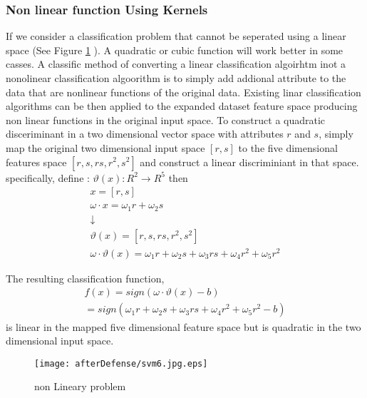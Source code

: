 \subsubsection {Non linear function Using Kernels}
If we consider a classification problem that cannot be seperated using a linear space (See Figure \ref{fig:svm6} ). A quadratic or  cubic function will work better in some casses. A classific method of converting a linear classification algoirhtm inot a nonolinear classification algoorithm is to simply add addional attribute to the data that are nonlinear functions of the original data. Existing linar classification algorithms can be then applied to the expanded dataset feature space producing non linear functions in the original input space. To construct a quadratic disceriminant in a two dimensional vector space with attributes $r$ and $s$, simply map the original two dimensional input space $\left[r,s\right]$ to the five dimensional features space $\left[r,s,rs,r^2,s^2\right]$ and construct a linear discriminiant in that space. specifically, define : $\vartheta(x):R^2  \rightarrow R^5$ then 
\begin{equation}
\begin{array}{l}
	x=[r,s] \\
	\omega \cdot x=\omega_1 r+ \omega_2 s \\
	\downarrow \\
	\vartheta(x)=\left[r,s,rs,r^2,s^2\right] \\
	
	 \omega \cdot \vartheta(x)= \omega_1 r+ \omega_2 s + \omega_3 rs+ \omega_4 r^2+\omega_5 r^2 
\end{array}
\label{eq:kernel}
\end{equation}  

The resulting classification function, 
\begin{equation}
\begin{array}{l}
f(x)=sign\left( \omega \cdot\vartheta(x)-b \right) \\
= sign\left( \omega_1 r+ \omega_2 s + \omega_3 rs+ \omega_4 r^2+\omega_5 r^2 -b \right) 
\end{array}
\label{eq:kern2}
\end{equation}  
is linear in the mapped five dimensional feature space but is quadratic in the two dimensional input space. 

\begin{figure}
	\centering
		\texttt{[image: afterDefense/svm6.jpg.eps]}
	\caption{non Lineary problem }
	\label{fig:svm6}
\end{figure}



